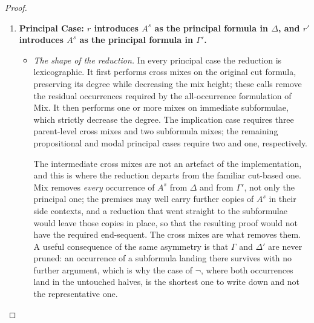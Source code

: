 \documentclass{article}
\newcommand{\pf}[2]{{#1}^{#2}} %
\theoremstyle{definition}
\begin{document}
\begin{proof}
\begin{enumerate}
    \item \textbf{Principal Case: $r$ introduces $\pf{A}{s}$ as the principal formula in $\Delta$, and $r'$ introduces $\pf{A}{s}$ as the principal formula in $\Gamma'$.}
        \begin{itemize}
            \item \textit{The shape of the reduction.} In every principal case the reduction is lexicographic. It first performs cross mixes on the original cut formula, preserving its degree while decreasing the mix height; these calls remove the residual occurrences required by the all-occurrence formulation of Mix. It then performs one or more mixes on immediate subformulae, which strictly decrease the degree. The implication case requires three parent-level cross mixes and two subformula mixes; the remaining propositional and modal principal cases require two and one, respectively.

            The intermediate cross mixes are not an artefact of the implementation, and this is where the reduction departs from the familiar cut-based one. Mix removes \emph{every} occurrence of $\pf{A}{s}$ from $\Delta$ and from $\Gamma'$, not only the principal one; the premises may well carry further copies of $\pf{A}{s}$ in their side contexts, and a reduction that went straight to the subformulae would leave those copies in place, so that the resulting proof would not have the required end-sequent. The cross mixes are what removes them. A useful consequence of the same asymmetry is that $\Gamma$ and $\Delta'$ are never pruned: an occurrence of a subformula landing there survives with no further argument, which is why the case of $\neg$, where both occurrences land in the untouched halves, is the shortest one to write down and not the representative one.


\end{itemize}
\end{enumerate}
\end{proof}
\end{document}
